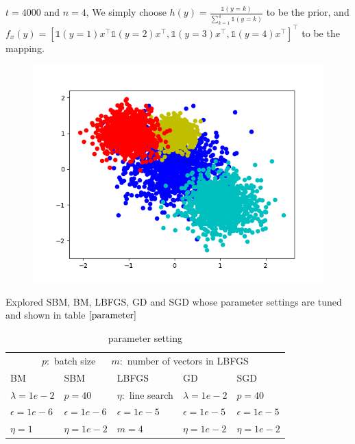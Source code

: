 \documentclass{beamer}
\begin{document}
\begin{frame}
   $t = 4000$ and $n = 4$, 
 We simply choose $h(y) = \frac{\mathds{1}(y = k)}{\sum_{k=1}^{4} \mathds{1}(y = k)}$ to be the prior, and $f_{x}(y) = [ \mathds{1}(y = 1) x^{\top}\mathds{1}(y = 2) x^{\top}, \mathds{1}(y = 3) x^{\top}, \mathds{1}(y = 4) x^{\top}  ]^{\top}$
 to be the mapping. 
 
 \begin{figure}[htbp]
   \centering
   \includegraphics[width = .7\textwidth]{multi4.png}
   \label{dataset}
 \end{figure}
\end{frame}


\begin{frame}
  
    Explored SBM, BM, LBFGS, GD and SGD whose parameter settings are tuned and shown in table $\ref{parameter}$
    \begin{table}[htbp]
      \caption{parameter setting}
      \label{parameter}
      \centering
      \begin{tabular}{lllll}
        \toprule
        \multicolumn{5}{c}{$p:$ batch size $\quad$  $m:$ number of vectors in LBFGS }                   \\
        \cmidrule(r){1-5}
        BM     & SBM    & LBFGS & GD & SGD \\
        \midrule
        $\lambda = 1e-2$ &  $p = 40$  & $\eta:$ line search &$\lambda = 1e-2$ &$p = 40$      \\
         $\epsilon = 1e-6$    &  $\epsilon = 1e-6$  &  $\epsilon = 1e-5$ & $\epsilon = 1e-5$& $\epsilon = 1e-5$ \\
        $ \eta = 1$   &  $ \eta = 1e-2$   &  $m = 4$ &$\eta = 1e-2$ &$\eta = 1e-2$  \\
        \bottomrule
      \end{tabular}
    \end{table}

\end{frame}
\end{document}
